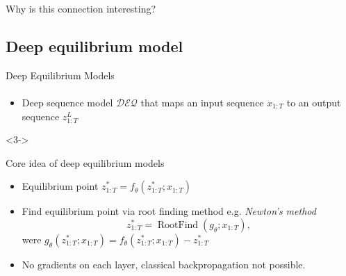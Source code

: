 \documentclass[8pt, t,
aspectratio=169,%
]{beamer}
\begin{document}
\begin{frame}{Why is this connection interesting?}
\end{frame}


\subsection{Deep equilibrium model}
\begin{frame}{Deep Equilibrium Models}
    \framesubtitle{\cite{bai2019deep}}

    \begin{itemize}
        \item Deep sequence model $\mathcal{DEQ}$ that maps an input sequence $x_{1:T}$ to an output sequence $z_{1:T}^L$
    \end{itemize}

    \begin{figure}
        
    \end{figure}

    \begin{onlyenv}<3->
        \begin{block}{Core idea of deep equilibrium models}
            \begin{itemize}
                \item  Equilibrium point $z_{1:T}^* = f_{\theta}(z_{1:T}^*;x_{1:T})$
                \item Find equilibrium point via root finding method e.g. \emph{Newton's method}
                    \begin{equation}
                        \label{eq:root_find}
                        z_{1:T}^* = \operatorname{RootFind}(g_{\theta}; x_{1:T}),
                    \end{equation}
                    were $g_{\theta}(z_{1:T}^{*}; x_{1:T}) = f_{\theta}(z_{1:T}^{*}; x_{1:T})-z_{1:T}^*$
                \item No gradients on each layer, classical backpropagation not possible.
            \end{itemize}
        \end{block}
    \end{onlyenv}


\end{frame}
\end{document}
